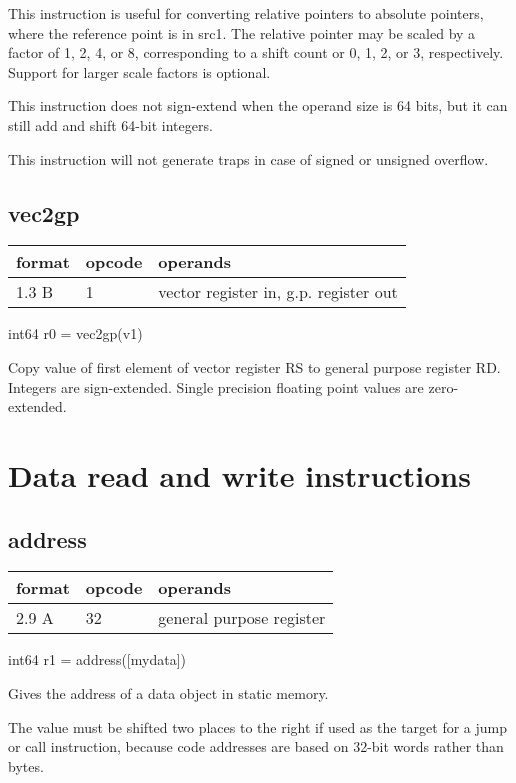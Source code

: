 \documentclass[forwardcom.tex]{subfiles}
\begin{document}
This instruction is useful for converting relative pointers to absolute pointers, where the reference point is in src1. The relative pointer may be scaled by a factor of 1, 2, 4, or 8, corresponding to a shift count or 0, 1, 2, or 3, respectively. Support for larger scale factors is optional.
\vv

This instruction does not sign-extend when the operand size is 64 bits, but it can still add and shift 64-bit integers.
\vv

This instruction will not generate traps in case of signed or unsigned overflow.
\vv


\subsection{vec2gp}
\label{table:vec2gpInstruction}
\begin{tabular}{|p{12mm}|p{15mm}|p{100mm}|}
\hline
\bfseries format & \bfseries opcode & \bfseries operands \\ \hline
1.3 B & 1 & vector register in, g.p. register out \\ \hline
\end{tabular}
\vv

int64 r0 = vec2gp(v1)
\vv

Copy value of first element of vector register RS to general purpose register RD. Integers are sign-extended. Single precision floating point values are zero-extended.
\vv


\section{Data read and write instructions}
\vv

\subsection{address}
\label{table:addressInstruction}
\begin{tabular}{|p{12mm}|p{15mm}|p{100mm}|}
\hline
\bfseries format & \bfseries opcode & \bfseries operands \\ \hline
2.9 A & 32 & general purpose register \\ \hline
\end{tabular}
\vv

int64 r1 = address([mydata])
\vv

Gives the address of a data object in static memory.
\vv

The value must be shifted two places to the right if used as the target for a jump or call instruction, because code addresses are based on 32-bit words rather than bytes.
\vv
\end{document}
